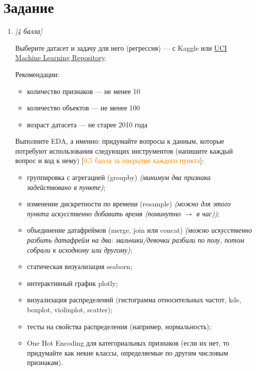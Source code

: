 \section{Задание}

\begin{enumerate}[label=\textbf{Task \arabic*:}, leftmargin=*]

\item \textit{[4 балла]}

Выберите датасет и задачу для него (регрессия) --- с Kaggle или \href{https://archive.ics.uci.edu/datasets}{UCI Machine Learning Repository}.

Рекомендации:
\begin{itemize}
    \item количество признаков --- не менее 10
    \item количество объектов --- не менее 100
    \item возраст датасета --- не старее 2010 года
\end{itemize}

Выполните EDA, а именно: придумайте вопросы к данным, которые потребуют использования следующих инструментов (напишите каждый вопрос и код к нему) [\textcolor{DarkOrange}{0,5 балла за покрытие каждого пункта}]:
\begin{itemize}
    \item группировка с агрегацией (groupby) \textit{(минимум два признака задействовано в пункте)};
    \item изменение дискретности по времени (resample) \textit{(можно для этого пункта искусственно добавить время (поминутно $\rightarrow$ в час))};
    \item объединение датафреймов (merge, join или concat) \textit{(можно искусственно разбить датафрейм на два: мальчики/девочки разбили по полу, потом собрали к исходному или другому)};
    \item статическая визуализация seaborn;
    \item интерактивный график plotly;
    \item визуализация распределений (гистограмма относительных частот, kde, boxplot, violinplot, scatter);
    \item тесты на свойства распределения (например, нормальность);
    \item One Hot Encoding для категориальных признаков (если их нет, то придумайте как некие классы, определяемые по другим числовым признакам).
\end{itemize}


\end{enumerate}
